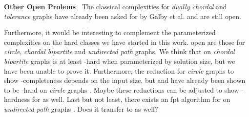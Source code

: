 \noindent \textbf{Other Open Prolems~}
The classical complexities for \textit{dually chordal} and \textit{tolerance} graphs have already been asked for by Galby et al. \cite{Galby2020} and are still open.

Furthermore, it would be interesting to complement the parameterized complexities on the hard classes we have started in this work.
open are those for \textit{circle}, \textit{chordal bipartite} and \textit{undirected path} graphs.
We think that \sdoms on \textit{chordal bipartite} graphs is at least \WONEhs-hard when parameterized by solution size, but we have been unable to prove it.
Furthermore, the reduction for \textit{circle} graphs \cite{Kloks2021} to show \NP-completeness depends on the input size, but \doms and \tdoms have already been shown to be \WONEhs-hard on \textit{circle} graphs \cite{Bousquet2012}. 
Maybe these reductions can be adjusted to show \WONEhs-hardness for \sdoms as well.
Last but not least, there exists an fpt algorithm for \doms on \textit{undirected path} graphs \cite{Figueiredo2022}. 
Does it transfer to \sdoms as well?

